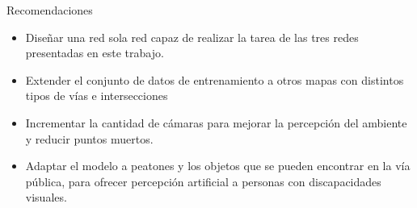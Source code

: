 \documentclass[10pt, usepdftitle=false]{beamer}
\begin{document}
\begin{frame}[fragile]{Recomendaciones}
% 
	\begin{itemize}[<+-|alert@+>]
		\item Diseñar una red sola red capaz de realizar la tarea de las tres redes presentadas en este trabajo.
		
		\item Extender el conjunto de datos de entrenamiento a otros mapas con distintos tipos de vías e intersecciones
		
		\item Incrementar la cantidad de cámaras para mejorar la percepción del ambiente y reducir puntos muertos.
		
		\item Adaptar el modelo a peatones y los objetos que se pueden encontrar en la vía pública, para ofrecer percepción artificial a personas con discapacidades visuales.
	\end{itemize}
\end{frame}
\end{document}
